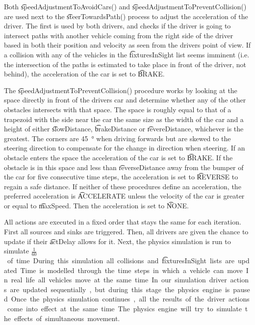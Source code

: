 Both \t{speedAdjustmentToAvoidCars()} and \t{speedAdjustmentToPreventCollision()} are used next to the \t{steerTowardsPath()} process to adjust the acceleration of the driver. The first is used by both drivers, and checks if the driver is going to intersect paths with another vehicle coming from the right side of the driver based in both their position and velocity as seen from the drivers point of view. If a collision with any of the vehicles in the \t{fixturesInSight} list seems imminent (i.e. the intersection of the paths is estimated to take place in front of the driver, not behind), the acceleration of the car is set to \t{BRAKE}.

The \t{speedAdjustmentToPreventCollision()} procedure works by looking at the space directly in front of the drivers car and determine whether any of the other obstacles intersects with that space. The space is roughly equal to that of a trapezoid with the side near the car the same size as the width of the car and a height of either \t{slowDistance}, \t{brakeDistance} or \t{revereDistance}, whichever is the greatest. The corners are \si{45 \degree} when driving forwards but are skewed to the steering direction to compensate for the change in direction when steering. If an obstacle enters the space the acceleration of the car is set to \t{BRAKE}. If the obstacle is in this space and less than \t{reverseDistance} away from the bumper of the car for five consecutive time steps, the acceleration is set to \t{REVERSE} to regain a safe distance.
If neither of these procedures define an acceleration, the preferred acceleration is \t{ACCELERATE} unless the velocity of the car is greater or equal to \t{maxSpeed}. Then the acceleration is set to \t{NONE}.

All actions are executed in a fixed order that stays the same for each iteration. First all sources and sinks are triggered. Then, all drivers are given the chance to update if their \t{actDelay} allows for it. Next, the physics simulation is run to simulate \si{$\frac{1}{60}$ \second} of time. During this simulation all collisions and \t{fixturesInSight} lists are updated.

Time is modelled through the time steps in which a vehicle can move. In real life all vehicles move at the same time. In our simulation driver actions are updated sequentially, but during this stage the physics engine is paused. Once the physics simulation continues, all the results of the driver actions come into effect at the same time. The physics engine will try to simulate the effects of simultaneous movement.